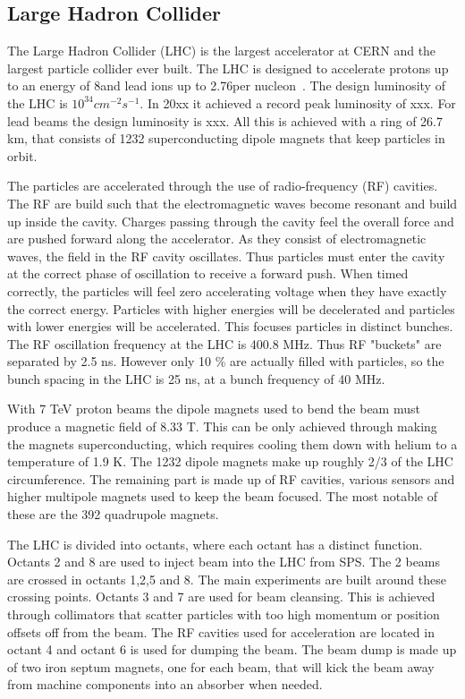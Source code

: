 \subsection{Large Hadron Collider}
\label{sec:lhc}
The Large Hadron Collider (LHC) is the largest accelerator at CERN and the largest particle collider ever built. The LHC is designed to accelerate protons up to an energy of 8\tev and lead ions up to 2.76\tev per nucleon~\cite{LHC}. The design luminosity of the LHC is $10^34 \unit{cm^{-2}s^{-1}}$. In 20xx it achieved a record peak luminosity of xxx. For lead beams the design luminosity is xxx. All this is achieved with a ring of 26.7 km, that consists of 1232 superconducting dipole magnets that keep particles in orbit. 

The particles are accelerated through the use of radio-frequency (RF) cavities. The RF are build such that the electromagnetic waves become resonant and build up inside the cavity. Charges passing through the cavity feel the overall force and are pushed forward along the accelerator. As they consist of electromagnetic waves, the field in the RF cavity oscillates. Thus particles must enter the cavity at the correct phase of oscillation to receive a forward push. When timed correctly, the particles will feel zero accelerating voltage when they have exactly the correct energy. Particles with higher energies will be decelerated  and particles with lower energies will be accelerated. This focuses particles in distinct bunches. The RF oscillation frequency at the LHC is 400.8 MHz. Thus  RF "buckets" are separated by 2.5 ns. However only 10 \% are actually filled with particles, so the bunch spacing in the LHC is 25 ns, at a bunch frequency of 40 MHz.

With 7 TeV proton beams the dipole magnets used to bend the beam must produce a magnetic field of 8.33 T. This can be only achieved through making the magnets superconducting, which requires cooling them down with helium to a temperature of 1.9 K. The 1232 dipole magnets make up roughly 2/3 of the LHC circumference. The remaining part is made up of RF cavities, various sensors and higher multipole magnets used to keep the beam focused. The most notable of these are the 392 quadrupole magnets.

The LHC is divided into octants, where each octant has a distinct function. Octants 2 and 8 are used to inject beam into the LHC from SPS. The 2 beams are crossed in octants 1,2,5 and 8. The main experiments are built around these crossing points. Octants 3 and 7 are used for beam cleansing. This is achieved through collimators that scatter particles with too high momentum or position offsets off from the beam. The RF cavities used for acceleration are located in octant 4 and octant 6 is used for dumping the beam. The beam dump is made up of two iron septum magnets, one for each beam, that will kick the beam away from machine components into an absorber when needed. 


